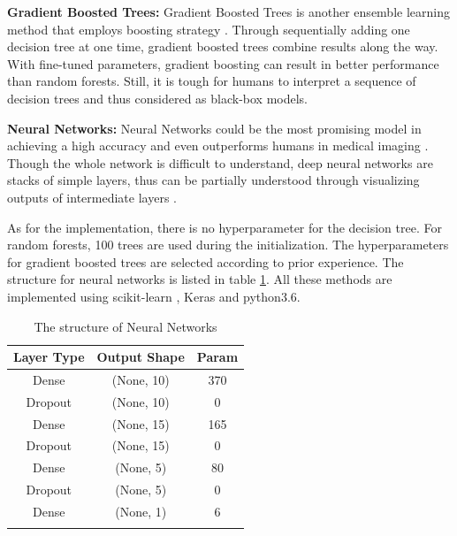\textbf{Gradient Boosted Trees:} Gradient Boosted Trees is another ensemble learning method that employs boosting strategy \citep{gbtrees}. Through sequentially adding one decision tree at one time, gradient boosted trees combine results along the way. With fine-tuned parameters, gradient boosting can result in better performance than random forests. Still, it is tough for humans to interpret a sequence of decision trees and thus considered as black-box models.

\textbf{Neural Networks:} Neural Networks could be the most promising model in achieving a high accuracy and even outperforms humans in medical imaging \citep{maier2018gentle}. Though the whole network is difficult to understand, deep neural networks are stacks of simple layers, thus can be partially understood through visualizing outputs of intermediate layers \citep{Montavon_2018}.


As for the implementation, there is no hyperparameter for the decision tree. For random forests, 100 trees are used during the initialization. The hyperparameters for gradient boosted trees are selected according to prior experience. The structure for neural networks is listed in table \ref{tab:nn}. All these methods are implemented using scikit-learn \citep{scikit-learn}, Keras and python3.6.

\begin{table}[H]
\centering
\caption{The structure of Neural Networks}
\begin{tabular}{@{}ccc@{}}
\toprule
Layer Type   & Output Shape & Param \\ \midrule
Dense & (None, 10) & 370           \\
Dropout & (None, 10) & 0           \\
Dense & (None, 15) & 165           \\
Dropout & (None, 15) & 0           \\
Dense & (None, 5) & 80           \\
Dropout & (None, 5) & 0           \\
Dense & (None, 1) & 6           \\
\bottomrule
\label{tab:nn}
\end{tabular}
\end{table}

